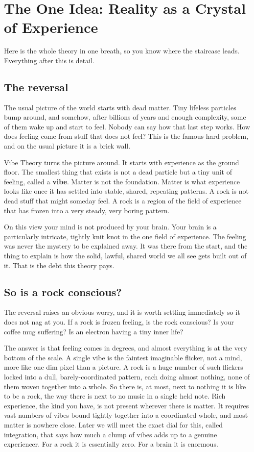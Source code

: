\section{The One Idea: Reality as a Crystal of Experience}

Here is the whole theory in one breath, so you know where the staircase leads. Everything after this is detail.

\subsection{The reversal}

The usual picture of the world starts with dead matter. Tiny lifeless particles bump around, and somehow, after billions of years and enough complexity, some of them wake up and start to feel. Nobody can say how that last step works. How does feeling come from stuff that does not feel? This is the famous hard problem, and on the usual picture it is a brick wall.

Vibe Theory turns the picture around. It starts with experience as the ground floor. The smallest thing that exists is not a dead particle but a tiny unit of feeling, called a \textbf{vibe}. Matter is not the foundation. Matter is what experience looks like once it has settled into stable, shared, repeating patterns. A rock is not dead stuff that might someday feel. A rock is a region of the field of experience that has frozen into a very steady, very boring pattern.

On this view your mind is not produced by your brain. Your brain is a particularly intricate, tightly knit knot in the one field of experience. The feeling was never the mystery to be explained away. It was there from the start, and the thing to explain is how the solid, lawful, shared world we all see gets built out of it. That is the debt this theory pays.

\subsection{So is a rock conscious?}

The reversal raises an obvious worry, and it is worth settling immediately so it does not nag at you. If a rock is frozen feeling, is the rock conscious? Is your coffee mug suffering? Is an electron having a tiny inner life?

The answer is that feeling comes in degrees, and almost everything is at the very bottom of the scale. A single vibe is the faintest imaginable flicker, not a mind, more like one dim pixel than a picture. A rock is a huge number of such flickers locked into a dull, barely-coordinated pattern, each doing almost nothing, none of them woven together into a whole. So there is, at most, next to nothing it is like to be a rock, the way there is next to no music in a single held note. Rich experience, the kind you have, is not present wherever there is matter. It requires vast numbers of vibes bound tightly together into a coordinated whole, and most matter is nowhere close. Later we will meet the exact dial for this, called integration, that says how much a clump of vibes adds up to a genuine experiencer. For a rock it is essentially zero. For a brain it is enormous.

